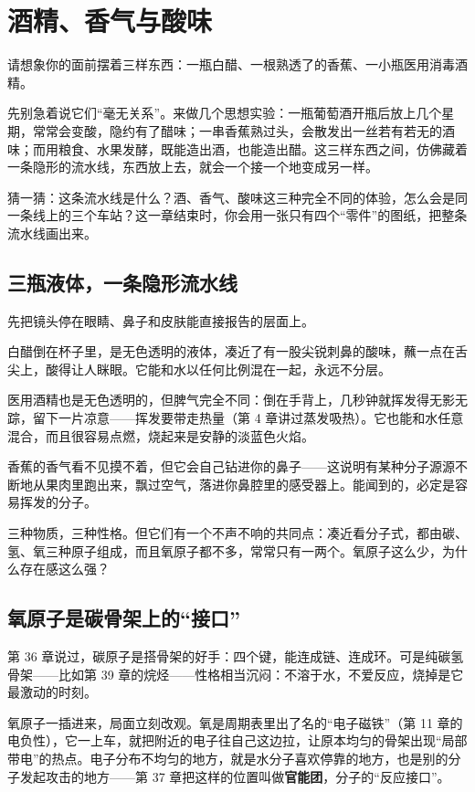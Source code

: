 \chapter{酒精、香气与酸味}

\begin{kaichang}
请想象你的面前摆着三样东西：一瓶白醋、一根熟透了的香蕉、一小瓶医用消毒酒精。

先别急着说它们“毫无关系”。来做几个思想实验：一瓶葡萄酒开瓶后放上几个星期，常常会变酸，隐约有了醋味；一串香蕉熟过头，会散发出一丝若有若无的酒味；而用粮食、水果发酵，既能造出酒，也能造出醋。这三样东西之间，仿佛藏着一条隐形的流水线，东西放上去，就会一个接一个地变成另一样。

猜一猜：这条流水线是什么？酒、香气、酸味这三种完全不同的体验，怎么会是同一条线上的三个车站？这一章结束时，你会用一张只有四个“零件”的图纸，把整条流水线画出来。
\end{kaichang}

\section{三瓶液体，一条隐形流水线}

先把镜头停在眼睛、鼻子和皮肤能直接报告的层面上。

白醋倒在杯子里，是无色透明的液体，凑近了有一股尖锐刺鼻的酸味，蘸一点在舌尖上，酸得让人眯眼。它能和水以任何比例混在一起，永远不分层。

医用酒精也是无色透明的，但脾气完全不同：倒在手背上，几秒钟就挥发得无影无踪，留下一片凉意——挥发要带走热量（第 4 章讲过蒸发吸热）。它也能和水任意混合，而且很容易点燃，烧起来是安静的淡蓝色火焰。

香蕉的香气看不见摸不着，但它会自己钻进你的鼻子——这说明有某种分子源源不断地从果肉里跑出来，飘过空气，落进你鼻腔里的感受器上。能闻到的，必定是容易挥发的分子。

三种物质，三种性格。但它们有一个不声不响的共同点：凑近看分子式，都由碳、氢、氧三种原子组成，而且氧原子都不多，常常只有一两个。氧原子这么少，为什么存在感这么强？

\section{氧原子是碳骨架上的“接口”}

第 36 章说过，碳原子是搭骨架的好手：四个键，能连成链、连成环。可是纯碳氢骨架——比如第 39 章的烷烃——性格相当沉闷：不溶于水，不爱反应，烧掉是它最激动的时刻。

氧原子一插进来，局面立刻改观。氧是周期表里出了名的“电子磁铁”（第 11 章的电负性），它一上车，就把附近的电子往自己这边拉，让原本均匀的骨架出现“局部带电”的热点。电子分布不均匀的地方，就是水分子喜欢停靠的地方，也是别的分子发起攻击的地方——第 37 章把这样的位置叫做\textbf{官能团}，分子的“反应接口”。

